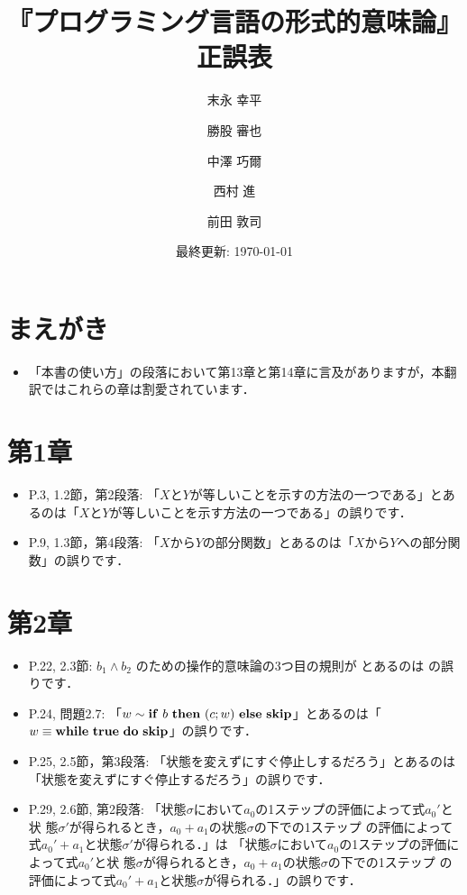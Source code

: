 \documentclass[12pt,titlepage,twoside,openright,dvipdfmx]{jsbook}
\title{『プログラミング言語の形式的意味論』正誤表}
\author{末永 幸平 \and 勝股 審也 \and 中澤 巧爾 \and 西村 進 \and 前田 敦司}
\date{最終更新: \today}
\theoremstyle{definition}
\begin{document}
\maketitle

\section*{まえがき}

\begin{itemize}
\item 「本書の使い方」の段落において第13章と第14章に言及がありますが，本翻訳ではこれらの章は割愛されています．
\end{itemize}

\section*{第1章}

\begin{itemize}
\item P.3, 1.2節，第2段落: 「$X$と$Y$が等しいことを示すの方法の一つである」とあるのは「$X$と$Y$が等しいことを示す方法の一つである」の誤りです．
\item P.9, 1.3節，第4段落: 「$X$から$Y$の部分関数」とあるのは「$X$から$Y$への部分関数」の誤りです．
\end{itemize}

\section*{第2章}

\begin{itemize}
  \item P.22, 2.3節: $b_1 \land b_2$ のための操作的意味論の3つ目の規則が
    \infrule
    { \arrow \Ttrue \andalso {} \arrow \Ttrue}
    { \arrow \Tfalse}
    とあるのは
    \infrule
    { \arrow \Ttrue \andalso {} \arrow \Ttrue}
    { \arrow \Ttrue}
    の誤りです．
  \item P.24, 問題2.7: 「$w \sim \Cif\ b\ \Cthen\ (c;w)\ \Celse\ \Cskip$」とあるのは「$w \equiv \Cwhile\ \Ttrue\ \Cdo\ \Cskip$」の誤りです．
  \item P.25, 2.5節，第3段落: 「状態を変えずにすぐ停止しするだろう」とあるのは「状態を変えずにすぐ停止するだろう」の誤りです．
  \item P.29, 2.6節, 第2段落:
    「状態$\sigma$において$a_0$の1ステップの評価によって式$a_0'$と状
    態$\sigma'$が得られるとき，$a_0+a_1$の状態$\sigma$の下での1ステップ
    の評価によって式$a_0'+a_1$と状態$\sigma'$が得られる．」は
    「状態$\sigma$において$a_0$の1ステップの評価によって式$a_0'$と状
    態$\sigma$が得られるとき，$a_0+a_1$の状態$\sigma$の下での1ステップ
    の評価によって式$a_0'+a_1$と状態$\sigma$が得られる．」の誤りです．
\end{itemize}
\end{document}
